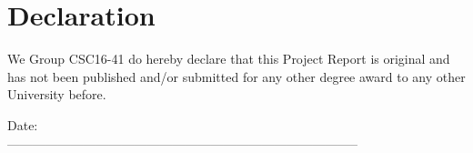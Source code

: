 \cleardoublepage
{}
\chapter*{Declaration}
We Group CSC16-41 do hereby declare that this Project Report is original and has not been published and/or submitted for any other degree award to any other University before.


\begin{table}[!ht]
\centering
{}
\end{table}
\vspace{1.0in}
\noindent
Date: \\
-----------------------------------------------------------------------------------
\newpage

